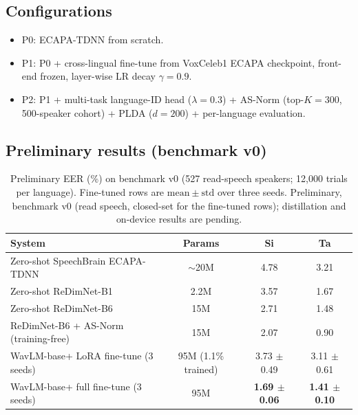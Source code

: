 \documentclass[11pt,a4paper]{article}
\begin{document}
\subsection{Configurations}
\label{sec:exp:configs}

\begin{itemize}[leftmargin=*]
    \item P0: ECAPA-TDNN from scratch.
    \item P1: P0 + cross-lingual fine-tune from VoxCeleb1 ECAPA
    checkpoint, front-end frozen, layer-wise LR decay $\gamma=0.9$.
    \item P2: P1 + multi-task language-ID head ($\lambda=0.3$) +
    AS-Norm (top-$K=300$, 500-speaker cohort) + PLDA ($d=200$) +
    per-language evaluation.
\end{itemize}

\subsection{Preliminary results (benchmark v0)}
\label{sec:exp:prelim}


\begin{table}[t]
\centering
\caption{Preliminary EER (\%) on benchmark v0 (527 read-speech
speakers; 12{,}000 trials per language). Fine-tuned rows are
$\mathrm{mean} \pm \mathrm{std}$ over three seeds. Preliminary,
benchmark v0 (read speech, closed-set for the fine-tuned rows);
distillation and on-device results are pending.}
\label{tab:prelim}
\begin{tabular}{lccc}
\toprule
\textbf{System} & \textbf{Params} & \textbf{Si} & \textbf{Ta} \\
\midrule
Zero-shot SpeechBrain ECAPA-TDNN        & $\sim$20M & 4.78 & 3.21 \\
Zero-shot ReDimNet-B1                   & 2.2M      & 3.57 & 1.67 \\
Zero-shot ReDimNet-B6                   & 15M       & 2.71 & 1.48 \\
ReDimNet-B6 + AS-Norm (training-free)   & 15M       & 2.07 & 0.90 \\
WavLM-base+ LoRA fine-tune (3 seeds)    & 95M (1.1\% trained) & 3.73 $\pm$ 0.49 & 3.11 $\pm$ 0.61 \\
WavLM-base+ full fine-tune (3 seeds)    & 95M       & \textbf{1.69 $\pm$ 0.06} & \textbf{1.41 $\pm$ 0.10} \\
\bottomrule
\end{tabular}
\end{table}
\end{document}
